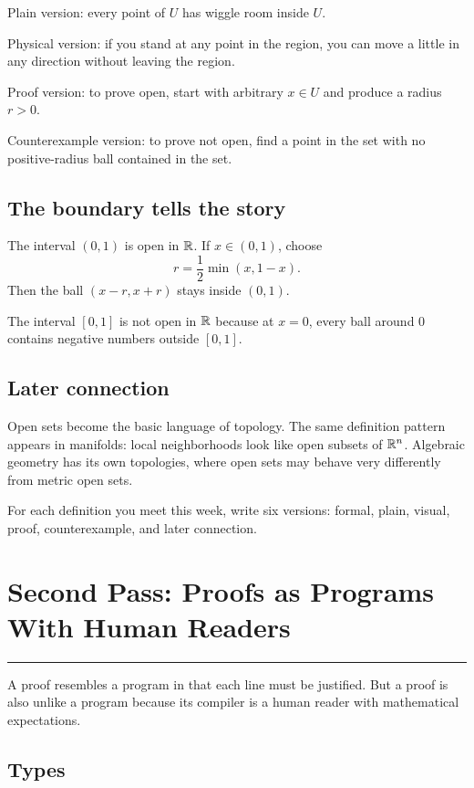\documentclass[12pt]{article}
\newcommand{\chapterline}{\vspace{0.4em}\hrule\vspace{0.8em}}
\begin{document}
Plain version: every point of $U$ has wiggle room inside $U$.

Physical version: if you stand at any point in the region, you can move a little in any direction without leaving the region.

Proof version: to prove open, start with arbitrary $x\in U$ and produce a radius $r>0$.

Counterexample version: to prove not open, find a point in the set with no positive-radius ball contained in the set.

\subsection{The boundary tells the story}

The interval $(0,1)$ is open in $\mathbb{R}$. If $x\in(0,1)$, choose
\[
r=\frac12\min(x,1-x).
\]
Then the ball $(x-r,x+r)$ stays inside $(0,1)$.

The interval $[0,1]$ is not open in $\mathbb{R}$ because at $x=0$, every ball around $0$ contains negative numbers outside $[0,1]$.

\subsection{Later connection}

Open sets become the basic language of topology. The same definition pattern appears in manifolds: local neighborhoods look like open subsets of $\mathbb{R}^n$. Algebraic geometry has its own topologies, where open sets may behave very differently from metric open sets.

\begin{labbox}
For each definition you meet this week, write six versions: formal, plain, visual, proof, counterexample, and later connection.
\end{labbox}

\newpage
\section{Second Pass: Proofs as Programs With Human Readers}
\chapterline

A proof resembles a program in that each line must be justified. But a proof is also unlike a program because its compiler is a human reader with mathematical expectations.

\subsection{Types}
\end{document}
